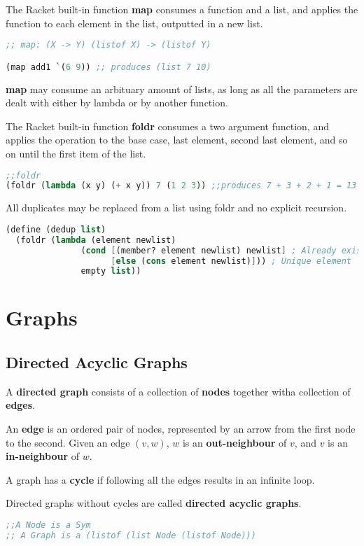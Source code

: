 \documentclass[english, 12pt]{article}
\begin{document}
\begin{defn}
The Racket built-in function \textbf{map} consumes a function and a list, and applies the function to each element in the list, outputted in a new list.
\begin{lstlisting}[language=Scheme]
;; map: (X -> Y) (listof X) -> (listof Y)

(map add1 `(6 9)) ;; produces (list 7 10)
\end{lstlisting}
\begin{note}
\textbf{map} may consume an arbituary amount of lists, as long as all the parameters are dealt with either by lambda or by another function.
\end{note}
\end{defn}
\begin{defn}
The Racket built-in function \textbf{foldr} consumes a two argument function, and applies the operation to the base case, last element, second last element, and so on until the first item of the list.

\begin{lstlisting}[language=Scheme]
;;foldr
(foldr (lambda (x y) (+ x y)) 7 (1 2 3)) ;;produces 7 + 3 + 2 + 1 = 13
\end{lstlisting}
\end{defn}
\begin{exmp}
All duplicates may be replaced from a list using foldr and no explicit recursion.
\begin{lstlisting}[language=Scheme]
(define (dedup list)
  (foldr (lambda (element newlist)
			   (cond [(member? element newlist) newlist] ; Already exists
			         [else (cons element newlist)])) ; Unique element 
			   empty list))
\end{lstlisting}
\end{exmp}
\section{Graphs}
\subsection{Directed Acyclic Graphs}
\begin{defn}
A \textbf{directed graph} consists of a collection of \textbf{nodes} together witha  collection of \textbf{edges}.
\end{defn}
\begin{defn}
An \textbf{edge} is an ordered pair of nodes, represented by an arrow from the first node to the second. Given an edge $(v,w)$, $w$ is an \textbf{out-neighbour} of $v$, and $v$ is an \textbf{in-neighbour} of $w$.
\end{defn} 
\begin{defn}
A graph has a \textbf{cycle} if following all the edges results in an infinite loop.
\end{defn}
\begin{defn}
Directed graphs without cycles are called \textbf{directed acyclic graphs}.
\end{defn}
\begin{lstlisting}[language=Scheme]
;;A Node is a Sym
;; A Graph is a (listof (list Node (listof Node)))
\end{lstlisting}
\end{document}
